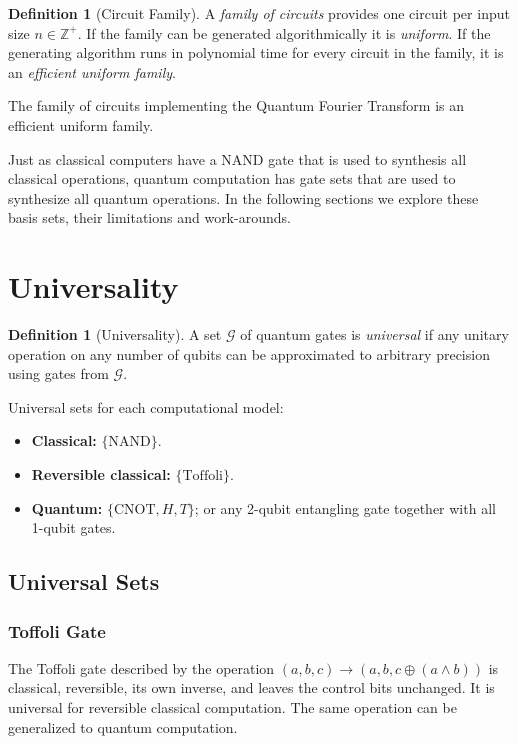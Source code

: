 \documentclass[12pt, a4paper, oneside]{report}
\theoremstyle{plain}
\theoremstyle{definition}
\newtheorem{definition}[theorem]{Definition}
\theoremstyle{remark}
\newcommand{\ZZ}{\mathbb{Z}}
\newcommand{\CNOT}{\mathrm{CNOT}}
\begin{document}
\begin{definition}[Circuit Family]
	A \emph{family of circuits} provides one circuit per input size $n \in \ZZ^+$. If the family
	can be generated algorithmically it is \emph{uniform}. If the generating algorithm runs in
	polynomial time for every circuit in the family, it is an \emph{efficient uniform family}.
\end{definition}

The family of circuits implementing the Quantum Fourier Transform is an efficient uniform
family.

Just as classical computers have a NAND gate that is used to synthesis all classical operations, quantum computation has gate sets that are used to synthesize all quantum operations. In the following sections we explore these basis sets, their limitations and work-arounds.

\section{Universality}

\begin{definition}[Universality]
	A set $\mathcal{G}$ of quantum gates is \emph{universal} if any unitary operation on any
	number of qubits can be approximated to arbitrary precision using gates from $\mathcal{G}$.
\end{definition}

Universal sets for each computational model:
\begin{itemize}
	\item \textbf{Classical:} $\{\text{NAND}\}$.
	\item \textbf{Reversible classical:} $\{\text{Toffoli}\}$.
	\item \textbf{Quantum:} $\{\CNOT, H, T\}$; or any 2-qubit entangling gate together with
	      all 1-qubit gates.
\end{itemize}

\subsection{Universal Sets}



\subsubsection{Toffoli Gate}

The Toffoli gate described by the operation $(a,b,c) \to (a, b, c \oplus (a \wedge b))$
is classical, reversible, its own inverse, and leaves the control bits
unchanged. It is universal for reversible classical computation. The same operation can be generalized to quantum computation.
\end{document}

